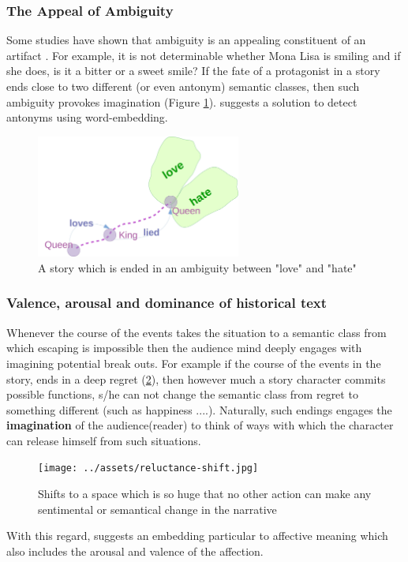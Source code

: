 \documentclass{article}
\begin{document}
			\subsubsection{The Appeal of Ambiguity}
			Some studies have shown that ambiguity is an appealing constituent of an artifact \citep{muth-2015-the-appeal-of-challenge-in-the-perception-of-art-how-ambiguity-solvability-of-ambiguity-and-the-opportunity-for-insight-affect-appreciation}. For example, it is not determinable whether Mona Lisa is smiling and if she does, is it a bitter or a sweet smile? If the fate of a protagonist in a story ends close to two different (or even antonym) semantic classes, then such ambiguity provokes imagination (Figure \ref{fig:ambiguity}). 
			\citet{ono-2015-word-embedding-based-antonym-detection-using-thesauri-and-distributional-information} suggests a solution to detect antonyms using word-embedding. 
			\begin{figure}[h!]
				\centering
				\includegraphics[width=0.6\textwidth]{../assets/ambiguity.jpg}
				\caption{A story which is ended in an ambiguity between "love" and "hate"} 
				\label{fig:ambiguity}
			\end{figure}
			\subsubsection{Valence, arousal and dominance of historical text}
			\citet{buechel-2016-feelings-from-the-past-adapting-affective-lexicons-for-historical-emotion-analysis}
			Whenever the course of the events takes the situation to a semantic class from which escaping is impossible then the audience mind deeply engages with imagining potential break outs. For example if the course of the events in the story, ends in a deep regret (\ref{fig:semantical-class-shift}), then however much a story character commits possible functions, s/he can not change the semantic class from regret to something different (such as happiness ....). Naturally, such endings engages the \textbf{imagination} of the audience(reader) to think of ways with which the character can release himself from such situations. 
			\begin{figure}[h!]
				\centering
				\texttt{[image: ../assets/reluctance-shift.jpg]}
				\caption{Shifts to a space which is so huge that no other action can make any sentimental or semantical change in the narrative} 
				\label{fig:semantical-class-shift}
			\end{figure}
			With this regard, \citet{li-2017-inferring-affective-meanings-of-words-from-word-embedding} suggests an embedding particular to affective meaning which also includes the arousal and valence of the affection.
			
\end{document}
